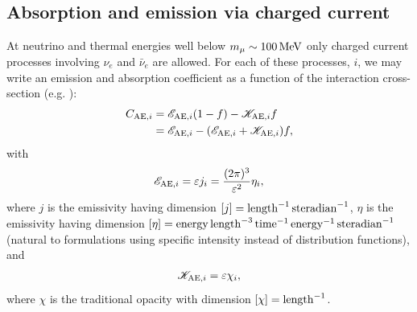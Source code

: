 \documentclass[aps,prd,twocolumn,superscriptaddress]{revtex4-1}
\newcommand{\todo}[1]{\marginpar{\tiny{\textcolor{red}{#1}}}}
\begin{document}
\subsection{Absorption and emission via charged current}
\label{ssec:sources_ae}
At neutrino and thermal energies well below $m_{\mu}\sim100\,{\rm MeV}$
only charged current processes involving $\nu_e$ and $\bar{\nu}_e$ are allowed.
For each of these processes, $i$, we may write an emission and absorption
coefficient as a function of the interaction cross-section
(e.g. \cite[Eqn.~A5]{brue1985-core_collapse}):
\todo{explain Fermi-blocking}
\begin{align}
  \label{eqn:sources_ae_1}
  C_{{\rm AE},i}
  &= \mathscr{E}_{{\rm AE},i} (1-f) - \mathscr{K}_{{\rm AE},i} f \\
  \label{eqn:sources_ae_2}
  &= \mathscr{E}_{{\rm AE},i} - (\mathscr{E}_{{\rm AE},i} + \mathscr{K}_{{\rm AE},i}) f,
\end{align}
with
\begin{equation}
  \label{eqn:inv_emissivity}
  \mathscr{E}_{{\rm AE},i}
  = \varepsilon j_i
  = \frac{(2\pi)^3}{\varepsilon^2}\eta_i,
\end{equation}
where $j$ is the emissivity having dimension
$[j]={\rm length}^{-1}\,{\rm steradian}^{-1}$,
$\eta$ is the emissivity having dimension
$[\eta]={\rm energy}\,{\rm length}^{-3}\,{\rm time}^{-1}\,{\rm energy}^{-1}\,{\rm steradian}^{-1}$
(natural to formulations using specific intensity instead of distribution
functions), and
\begin{equation}
  \label{eqn:inv_opacity}
  \mathscr{K}_{{\rm AE},i} = \varepsilon \chi_i,
\end{equation}
where $\chi$ is the traditional opacity with dimension
$[\chi]={\rm length}^{-1}$.
\end{document}
